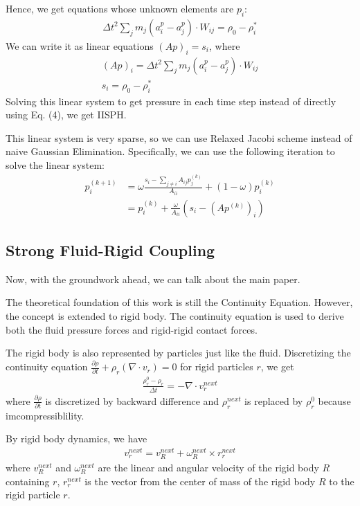 \documentclass[acmlarge]{acmart}
\begin{document}
Hence, we get equations whose unknown elements are $p_i$:
\begin{align*}
  \Delta t^2\sum_j m_j (a_i^p-a_j^p)\cdot  W_{ij}=\rho_0-\rho_i^*
\end{align*}
We can write it as linear equations $(Ap)_i=s_i$, where 
\begin{align*}
  (Ap)_i=\Delta t^2\sum_j m_j (a_i^p-a_j^p)\cdot  W_{ij}\\
  s_i=\rho_0-\rho_i^*
\end{align*}
Solving this linear system to get pressure in each time step instead of directly using Eq. (4), we get IISPH.

This linear system is very sparse, so we can use Relaxed Jacobi scheme instead of naive Gaussian Elimination. Specifically, 
we can use the following iteration to solve the linear system:
\begin{align*}
  p_i^{(k+1)}&=\omega\frac{s_i-\sum_{j\neq i}A_{ij}p_j^{(k)}}{A_{ii}}+(1-\omega)p_i^{(k)}\\
  &=p_i^{(k)}+\frac{\omega}{A_{ii}}(s_i-(Ap^{(k)})_i)
\end{align*}

\subsection{Strong Fluid-Rigid Coupling}

Now, with the groundwork ahead, we can talk about the main paper\cite{2019TOG}.

The theoretical foundation of this work is still the Continuity Equation. However, the 
concept is extended to rigid body. The continuity equation is used to derive both the fluid pressure forces 
and rigid-rigid contact forces.

The rigid body is also represented by particles just like the fluid.
Discretizing the continuity equation $\frac{\partial \rho}{\partial t}+\rho_r(\nabla \cdot  v_r)=0$ for rigid particles $r$, we get 
\begin{align}
  \frac{\rho_r^0-\rho_r}{\Delta t}=-\nabla \cdot v_r^{next}
\end{align}
where $\frac{\partial \rho}{\partial t}$ is discretized by backward difference and $\rho_r^{next}$ is replaced by $\rho_r^0$ because 
imcompressiblility.

By rigid body dynamics, we have
\begin{align}
  v_r^{next}=v_R^{next}+\omega_R^{next}\times r_r^{next}
\end{align}
where $v_R^{next}$ and $\omega_R^{next}$ are the linear and angular velocity of the rigid body $R$ containing $r$, 
$r_r^{next}$ is the vector from the center of mass of the rigid body $R$ to the rigid particle $r$.
\end{document}
